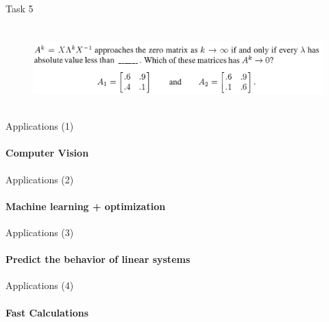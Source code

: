 \documentclass[aspectratio=169]{beamer}
\begin{document}
\begin{frame}[t]{Task 5}
    \framesubtitle{}
    \vspace{-0.5cm}
    \begin{figure}[H]
        \centering\includegraphics[height=3cm,width=1\textwidth,keepaspectratio]{5.png}
        \label{fig:5.png}
    \end{figure}
\end{frame}

\begin{frame}[t]{Applications (1)}
\framesubtitle{Computer Vision}
    
\end{frame}

\begin{frame}[t]{Applications (2)}
    \framesubtitle{Machine learning + optimization}
        
    \end{frame}

\begin{frame}[t]{Applications (3)}
    \framesubtitle{Predict the behavior of linear systems}
            
\end{frame}

\begin{frame}[t]{Applications (4)}
    \framesubtitle{Fast Calculations}
            
\end{frame}
\end{document}

